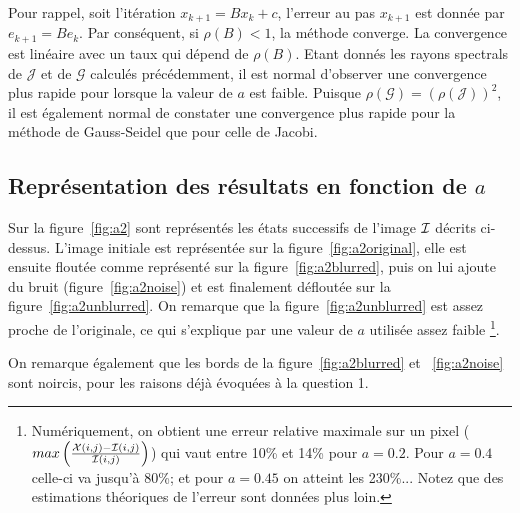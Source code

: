 Pour rappel, soit l'itération $x_{k+1} = B x_k + c$,
l'erreur au pas $x_{k+1}$ est donnée par $e_{k+1} = B e_k $. Par conséquent, si $\rho (B)<1$, la méthode converge. La convergence est linéaire avec un taux qui dépend de $\rho(B)$. Etant donnés les rayons spectrals de $\mathcal{J}$ et de $\mathcal{G}$ calculés précédemment, il est normal d'observer une convergence plus rapide pour lorsque la valeur de $a$ est faible. Puisque $\rho (\mathcal{G}) = (\rho (\mathcal{J}))^2$, il est également normal de constater une convergence plus rapide pour la méthode de Gauss-Seidel que pour celle de Jacobi. 



\subsection{Représentation des résultats en fonction de $a$}
Sur la figure~\ref{fig:a2} sont représentés les états successifs de l'image $\mathcal{I}$ décrits ci-dessus. L'image initiale est représentée sur la figure~\ref{fig:a2original}, elle est ensuite floutée comme représenté sur la figure~\ref{fig:a2blurred}, puis on lui ajoute du bruit (figure~\ref{fig:a2noise}) et est finalement défloutée sur la figure~\ref{fig:a2unblurred}.
On remarque que la figure~\ref{fig:a2unblurred} est assez proche de l'originale, ce qui s'explique par une valeur de $a$ utilisée assez faible \footnote{Numériquement, on obtient une erreur relative maximale sur un pixel ($max\left( \frac{\mathcal{X} (i,j) - \mathcal{I}(i,j)}{\mathcal{I} (i,j)} \right)$) qui vaut entre 10\% et 14\% pour $a=0.2$. Pour $a=0.4$ celle-ci va jusqu'à 80\%; et pour $a=0.45$ on atteint les 230\%... Notez que des estimations théoriques de l'erreur sont données plus loin.}.

On remarque également que les bords de la figure~\ref{fig:a2blurred} et ~\ref{fig:a2noise} sont noircis, pour les raisons déjà évoquées à la question 1.

